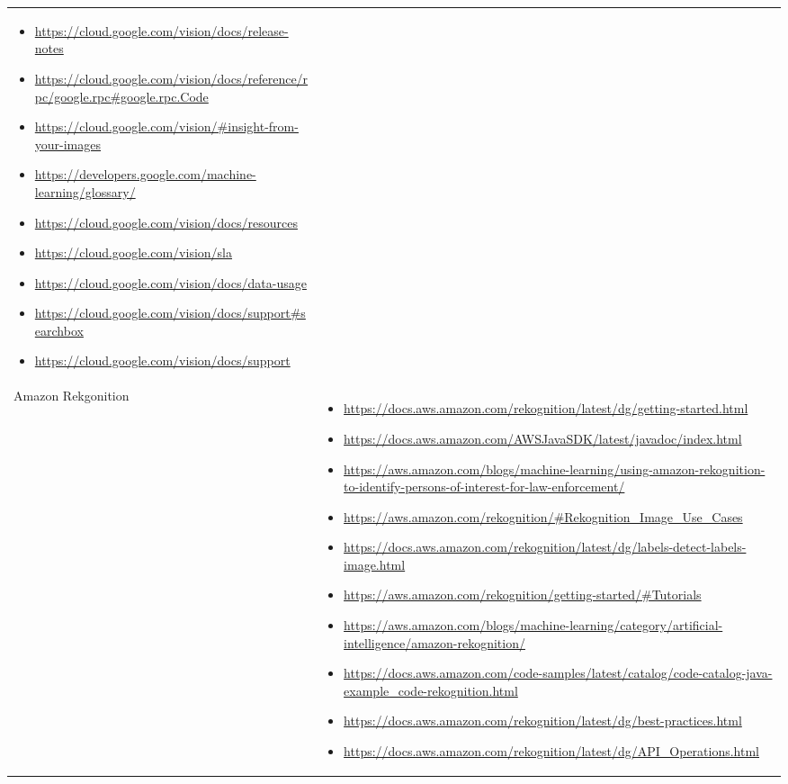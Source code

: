 {\begin{longtable}{p{.2\linewidth}|p{.725\linewidth}}
\begin{itemize}[label=,leftmargin=10pt,topsep=0pt,partopsep=0pt,noitemsep,nolistsep,itemindent=-10pt]
\item \url{https://cloud.google.com/vision/docs/release-notes}
\item \url{https://cloud.google.com/vision/docs/reference/rpc/google.rpc#google.rpc.Code}
\item \url{https://cloud.google.com/vision/#insight-from-your-images}
\item \url{https://developers.google.com/machine-learning/glossary/}
\item \url{https://cloud.google.com/vision/docs/resources}
\item \url{https://cloud.google.com/vision/sla}
\item \url{https://cloud.google.com/vision/docs/data-usage}
\item \url{https://cloud.google.com/vision/docs/support#searchbox}
\item \url{https://cloud.google.com/vision/docs/support}
    \end{itemize}\\
    Amazon Rekgonition &
    \vspace{-1.75mm}
    \begin{itemize}[label=,leftmargin=10pt,topsep=0pt,partopsep=0pt,noitemsep,nolistsep,itemindent=-10pt]
\item \url{https://docs.aws.amazon.com/rekognition/latest/dg/getting-started.html}
\item \url{https://docs.aws.amazon.com/AWSJavaSDK/latest/javadoc/index.html}
\item \url{https://aws.amazon.com/blogs/machine-learning/using-amazon-rekognition-to-identify-persons-of-interest-for-law-enforcement/}
\item \url{https://aws.amazon.com/rekognition/#Rekognition_Image_Use_Cases}
\item \url{https://docs.aws.amazon.com/rekognition/latest/dg/labels-detect-labels-image.html}
\item \url{https://aws.amazon.com/rekognition/getting-started/#Tutorials}
\item \url{https://aws.amazon.com/blogs/machine-learning/category/artificial-intelligence/amazon-rekognition/}
\item \url{https://docs.aws.amazon.com/code-samples/latest/catalog/code-catalog-java-example_code-rekognition.html}
\item \url{https://docs.aws.amazon.com/rekognition/latest/dg/best-practices.html}
\item \url{https://docs.aws.amazon.com/rekognition/latest/dg/API_Operations.html}

\end{itemize}
\end{longtable}}
